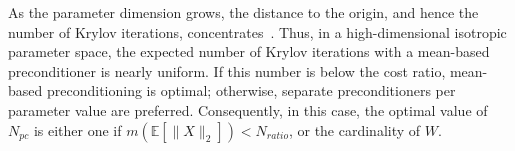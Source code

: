\begin{remark}\label{rem:high-dimensional-parameter-space}
As the parameter dimension grows, the distance to the origin, and hence the number of Krylov iterations, concentrates~\cite{aggarwal1973}.
Thus, in a high-dimensional isotropic parameter space, the expected number of Krylov iterations with a mean-based preconditioner is nearly uniform.
If this number is below the cost ratio, mean-based preconditioning is optimal; otherwise, separate preconditioners per parameter value are preferred.
Consequently, in this case, the optimal value of $N_{pc}$ is either one if $m\left(\mathbb{E}[\|X\|_{2}]\right) < N_{ratio}$, or the cardinality of $W$.
\end{remark}